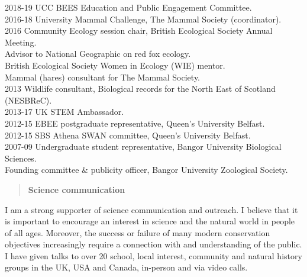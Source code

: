 \documentclass[]{article}
\begin{document}
2018-19 UCC BEES Education and Public Engagement Committee.\\
2016-18 University Mammal Challenge, The Mammal Society (coordinator).\\
2016 Community Ecology session chair, British Ecological Society Annual
Meeting.\\
Advisor to National Geographic on red fox ecology.\\
British Ecological Society Women in Ecology (WIE) mentor.\\
Mammal (hares) consultant for The Mammal Society.\\
2013 Wildlife consultant, Biological records for the North East of
Scotland (NESBReC).\\
2013-17 UK STEM Ambassador.\\
2012-15 EBEE postgraduate representative, Queen's University Belfast.\\
2012-15 SBS Athena SWAN committee, Queen's University Belfast.\\
2007-09 Undergraduate student representative, Bangor University
Biological Sciences.\\
Founding committee \& publicity officer, Bangor University Zoological
Society.

\begin{quote}
\textbf{Science communication}
\end{quote}

I am a strong supporter of science communication and outreach. I believe
that it is important to encourage an interest in science and the natural
world in people of all ages. Moreover, the success or failure of many
modern conservation objectives increasingly require a connection with
and understanding of the public. I have given talks to over 20 school,
local interest, community and natural history groups in the UK, USA and
Canada, in-person and via video calls.
\end{document}
